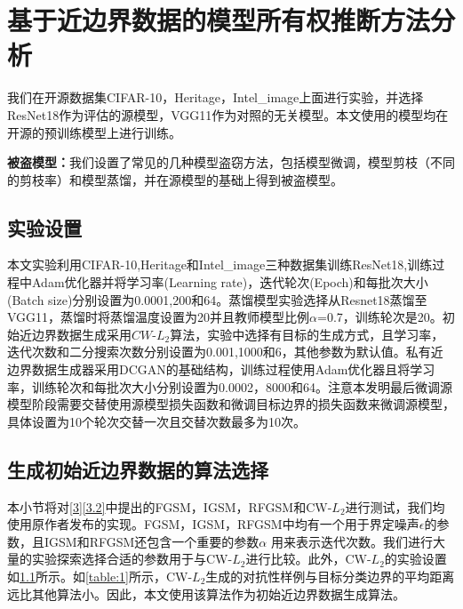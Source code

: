 
\chapter{基于近边界数据的模型所有权推断方法分析}\label{5}

我们在开源数据集CIFAR-10\cite{krizhevsky2009learning}，Heritage\cite{Heritage}，Intel\_image\cite{Intel_image}上面进行实验，并选择ResNet18作为评估的源模型，VGG11作为对照的无关模型。本文使用的模型均在开源的预训练模型上进行训练。

\noindent\textbf{被盗模型：}我们设置了常见的几种模型盗窃方法，包括模型微调，模型剪枝（不同的剪枝率）和模型蒸馏，并在源模型的基础上得到被盗模型。

\section{实验设置}\label{5.1}

本文实验利用CIFAR-10,Heritage和Intel\_image三种数据集训练ResNet18,训练过程中Adam优化器并将学习率(Learning rate)，迭代轮次(Epoch)和每批次大小(Batch size)分别设置为0.0001,200和64。蒸馏模型实验选择从Resnet18蒸馏至VGG11，蒸馏时将蒸馏温度设置为20并且教师模型比例$\alpha$=0.7，训练轮次是20。初始近边界数据生成采用$CW$-$L_2$算法，实验中选择有目标的生成方式，且学习率，迭代次数和二分搜索次数分别设置为0.001,1000和6，其他参数为默认值。私有近边界数据生成器采用DCGAN的基础结构，训练过程使用Adam优化器且将学习率，训练轮次和每批次大小分别设置为0.0002，8000和64。注意本发明最后微调源模型阶段需要交替使用源模型损失函数和微调目标边界的损失函数来微调源模型，具体设置为10个轮次交替一次且交替次数最多为10次。



\section{生成初始近边界数据的算法选择}\label{5.2}

本小节将对\ref{3}\ref{3.2}中提出的FGSM，IGSM，RFGSM和CW-$L_2$进行测试，我们均使用原作者发布的实现。FGSM，IGSM，RFGSM中均有一个用于界定噪声$\epsilon$的参数，且IGSM和RFGSM还包含一个重要的参数$\alpha$ 用来表示迭代次数。我们进行大量的实验探索选择合适的参数用于与CW-$L_2$进行比较。此外，CW-$L_2$的实验设置如\ref{5.1}所示。如\ref{table:1}所示，CW-$L_2$生成的对抗性样例与目标分类边界的平均距离远比其他算法小。因此，本文使用该算法作为初始近边界数据生成算法。

